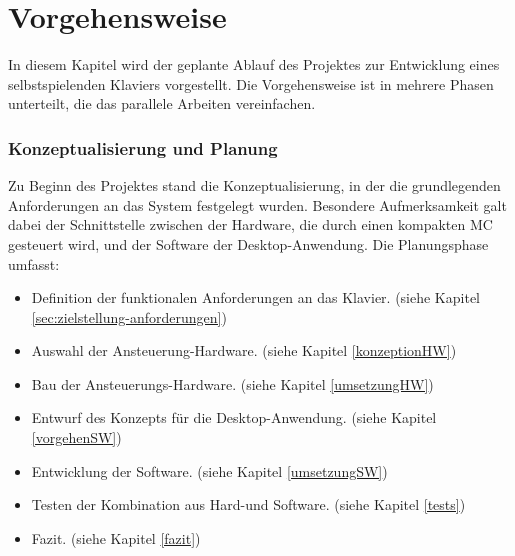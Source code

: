 \section{Vorgehensweise} \label{sec:zielstellung-vorgehen}

In diesem Kapitel wird der geplante Ablauf des Projektes zur Entwicklung eines selbstspielenden Klaviers vorgestellt.
Die Vorgehensweise ist in mehrere Phasen unterteilt, die das parallele Arbeiten vereinfachen. %

\subsubsection{Konzeptualisierung und Planung}\label{Vorgehensweise - Konzeptualisierung und Planung}

Zu Beginn des Projektes stand die Konzeptualisierung, in der die grundlegenden Anforderungen an das System festgelegt wurden.
Besondere Aufmerksamkeit galt dabei der Schnittstelle zwischen der Hardware, die durch einen kompakten \ac{MC} gesteuert wird, und der Software der Desktop-Anwendung.
Die Planungsphase umfasst: %

\begin{itemize}
    \item Definition der funktionalen Anforderungen an das Klavier. (siehe Kapitel \ref{sec:zielstellung-anforderungen})
    \item Auswahl der Ansteuerung-Hardware. (siehe Kapitel \ref{konzeptionHW})
    \item Bau der Ansteuerungs-Hardware. (siehe Kapitel \ref{umsetzungHW})
    \item Entwurf des Konzepts für die Desktop-Anwendung. (siehe Kapitel \ref{vorgehenSW})
    \item Entwicklung der Software. (siehe Kapitel \ref{umsetzungSW})
    \item Testen der Kombination aus Hard-und Software. (siehe Kapitel \ref{tests})
    \item Fazit. (siehe Kapitel \ref{fazit})
\end{itemize}

